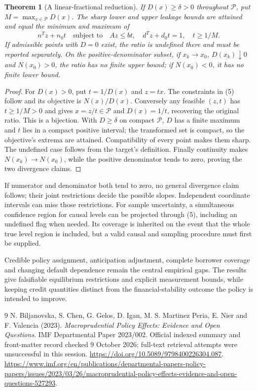 \documentclass[11pt]{article}
\newtheorem{theorem}{Theorem}
\theoremstyle{remark}
\begin{document}
\begin{theorem}[A linear-fractional reduction]
If $D(x)\geq\delta>0$ throughout $\mathcal P$, put
$M=\max_{x\in\mathcal P}D(x)$. The sharp lower and
upper leakage bounds are attained and equal the minimum and maximum of
\[
 n^Tz+n_0t\quad\text{subject to}\quad
 Az\leq bt,\quad d^Tz+d_0t=1,\quad t\geq1/M.                           \tag{5}
\]
If admissible points with $D=0$ exist, the ratio is undefined there and
must be reported separately. On the positive-denominator subset,
if $x_k\to x_0$, $D(x_k)\downarrow0$ and $N(x_0)>0$, the ratio has
no finite upper bound; if $N(x_0)<0$, it has no finite lower bound.
\end{theorem}
\begin{proof}
For $D(x)>0$, put $t=1/D(x)$ and $z=tx$. The constraints in (5) follow
and its objective is $N(x)/D(x)$. Conversely any feasible $(z,t)$ has
$t\geq1/M>0$ and gives $x=z/t\in\mathcal P$ and $D(x)=1/t$, recovering the
original ratio. This is a bijection. With $D\geq\delta$ on compact
$\mathcal P$, $D$ has a finite maximum and $t$ lies in a compact
positive interval; the transformed set is compact, so the objective's
extrema are attained. Compatibility of every point makes them sharp.
The undefined case follows from the target's definition. Finally continuity
makes $N(x_k)\to N(x_0)$, while the positive denominator tends to zero,
proving the two divergence claims.
\end{proof}
If numerator and denominator both tend to zero, no general divergence
claim follows; their joint restrictions decide the possible slopes.
Independent coordinate intervals can miss those restrictions. For sample
uncertainty, a simultaneous confidence region for causal levels can be
projected through (5), including an undefined flag when needed. Its
coverage is inherited on the event that the whole true level region is
included, but a valid causal and sampling procedure must first be supplied.

Credible policy assignment, anticipation adjustment, complete borrower
coverage and changing default dependence remain the central empirical
gaps. The results give falsifiable equilibrium restrictions and explicit
measurement bounds, while keeping credit quantities distinct from the
financial-stability outcome the policy is intended to improve.

\begin{thebibliography}{9}
 N. Biljanovska, S. Chen, G. Gelos, D. Igan,
M. S. Martinez Peria, E. Nier and F. Valencia (2023).
\emph{Macroprudential Policy Effects: Evidence and Open Questions}.
IMF Departmental Paper 2023/002.
Official indexed summary and front-matter record checked 9 October 2026;
full-text retrieval attempts were unsuccessful in this session.
\url{https://doi.org/10.5089/9798400226304.087}.
\url{https://www.imf.org/en/publications/departmental-papers-policy-papers/issues/2023/03/26/macroprudential-policy-effects-evidence-and-open-questions-527293}.
\end{thebibliography}
\end{document}
